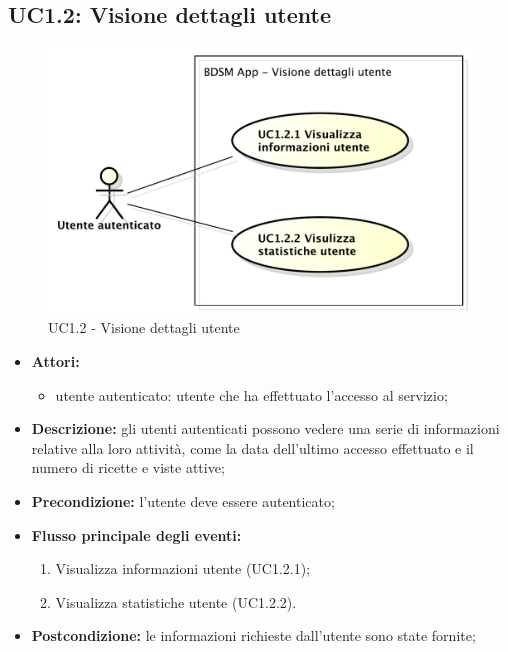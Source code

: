 \subsection{UC1.2: Visione dettagli utente}
\begin{figure}[htbp]
	\centering
	\centerline{\includegraphics[scale=0.45]{./images/UC1_2.pdf}}
	\caption{UC1.2 - Visione dettagli utente}
\end{figure}

\begin{itemize}
	\item \textbf{Attori:}
	\begin{itemize}
		\item utente autenticato: utente che ha effettuato l'accesso al servizio;
	\end{itemize}
	\item \textbf{Descrizione:} gli utenti autenticati possono vedere una serie di informazioni relative alla 	loro attività, come la data dell'ultimo accesso effettuato e il numero di ricette e viste attive;
	\item \textbf{Precondizione:} l'utente deve essere autenticato;
	\item \textbf{Flusso principale degli eventi:}
	\begin{enumerate}
		\item Visualizza informazioni utente (UC1.2.1);
		\item Visualizza statistiche utente (UC1.2.2).
	\end{enumerate}
	\item \textbf{Postcondizione:} le informazioni richieste dall'utente sono state fornite;
\end{itemize}

